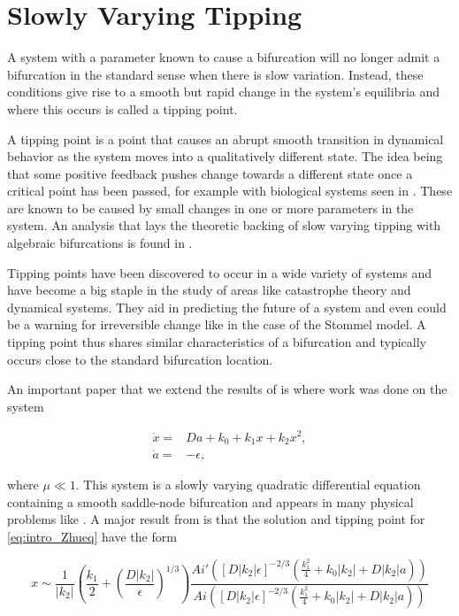\section*{Slowly Varying Tipping}
A system with a parameter known to cause a bifurcation will no longer admit a bifurcation in the standard sense when there is slow variation. Instead, these conditions give rise to a smooth but rapid change in the system's equilibria and where this occurs is called a tipping point.

A tipping point is a point that causes an abrupt smooth transition in dynamical behavior as the system moves into a qualitatively different state. The idea being that some positive feedback pushes change towards a different state once a critical point has been passed, for example with biological systems seen in \cite{angeli2004detection}. These are known to be caused by small changes in one or more parameters in the system. An analysis that lays the theoretic backing of slow varying tipping with algebraic bifurcations is found in \cite{haberman1979slowly}.

Tipping points have been discovered to occur in a wide variety of systems and have become a big staple in the study of areas like catastrophe theory and dynamical systems. They aid in predicting the future of a system and even could be a warning for irreversible change like in the case of the Stommel model. A tipping point thus shares similar characteristics of a bifurcation and typically occurs close to the standard bifurcation location.

An important paper that we extend the results of is \cite{zhu2015tipping} where work was done on the system

\begin{equation}\label{eq:intro_Zhueq}
\begin{aligned}
\dot{x} =& Da + k_0 +k_1 x + k_2 x^2,\\
\dot{a} =& -\epsilon,
\end{aligned}
\end{equation}

where $\mu\ll 1$. This system is a slowly varying quadratic differential equation containing a smooth saddle-node bifurcation and appears in many physical problems like \cite{erneux1989jump}. A major result from \cite{zhu2015tipping} is that the solution and tipping point for \eqref{eq:intro_Zhueq} have the form

\begin{equation}\label{eq:intro_Zhuairy}
x\sim \frac{1}{|k_2|}\left(\frac{k_1}{2}+\left(\frac{D|k_2|}{\epsilon}\right)^{1/3}\right)\frac{Ai'\left([D|k_2|\epsilon]^{-2/3}\left(\frac{k_1^2}{4}+k_0|k_2|+D|k_2|a\right)\right)}{Ai\left([D|k_2|\epsilon]^{-2/3}\left(\frac{k_1^2}{4}+k_0|k_2|+D|k_2|a\right)\right)}
\end{equation}

